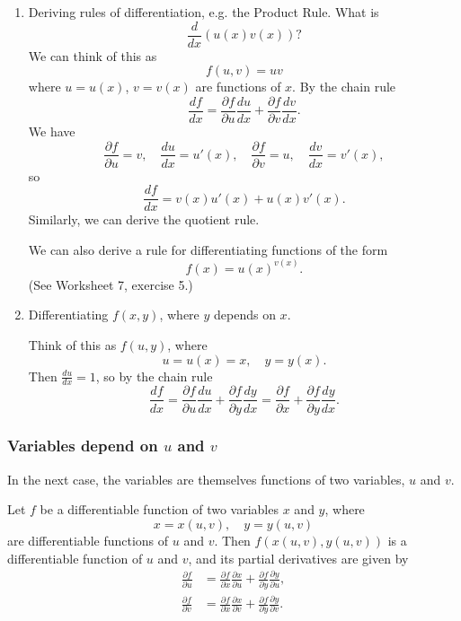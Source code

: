   \begin{enumerate}
    \item Deriving rules of differentiation, e.g. the Product Rule.  What is
      \[
        \frac{d}{dx}(u(x)v(x)) \text{?}
      \]
      We can think of this as
      \[
        f(u, v) = uv
      \]
      where $u = u(x)$, $v = v(x)$ are functions of $x$.  By the chain rule
      \[
        \frac{df}{dx} = \frac{\partial f}{\partial u}\frac{du}{dx} + \frac{\partial f}{\partial v}\frac{dv}{dx}.
      \]
      We have
      \[
        \frac{\partial f}{\partial u} = v, \quad \frac{du}{dx} = u'(x), \quad \frac{\partial f}{\partial v} = u, \quad \frac{dv}{dx} = v'(x),
      \]
      so
      \[
        \frac{df}{dx} = v(x)u'(x) + u(x)v'(x).
      \]
      Similarly, we can derive the quotient rule.

      We can also derive a rule for differentiating functions of the form
        \[
          f(x) = u(x)^{v(x)}.
        \]
      (See Worksheet 7, exercise 5.)
    \item Differentiating $f(x, y)$, where $y$ depends on $x$.

    Think of this as $f(u, y)$, where
      \[
        u = u(x) = x, \quad y = y(x).
      \]
    Then $\displaystyle \frac{du}{dx} = 1$, so by the chain rule
      \[
        \frac{df}{dx} = \frac{\partial f}{\partial u}\frac{du}{dx} + \frac{\partial f}{\partial y}\frac{dy}{dx} = \frac{\partial f}{\partial x} + \frac{\partial f}{\partial y}\frac{dy}{dx}.
      \]
  \end{enumerate}


  \subsubsection*{Variables depend on $u$ and $v$}

  In the next case, the variables are themselves functions of two variables, $u$ and $v$.

  Let $f$ be a differentiable function of two variables $x$ and $y$, where
    \[
      x = x(u, v), \quad y = y(u, v)
    \]
  are differentiable functions of $u$ and $v$.  Then $f(x(u, v), y(u, v))$ is a differentiable function of $u$ and $v$, and its partial derivatives are given by
    \begin{align*}
      \frac{\partial f}{\partial u} & = \frac{\partial f}{\partial x}\frac{\partial x}{\partial u} + \frac{\partial f}{\partial y}\frac{\partial y}{\partial u},  \\
      \frac{\partial f}{\partial v} & = \frac{\partial f}{\partial x}\frac{\partial x}{\partial v} + \frac{\partial f}{\partial y}\frac{\partial y}{\partial v}.
    \end{align*}

